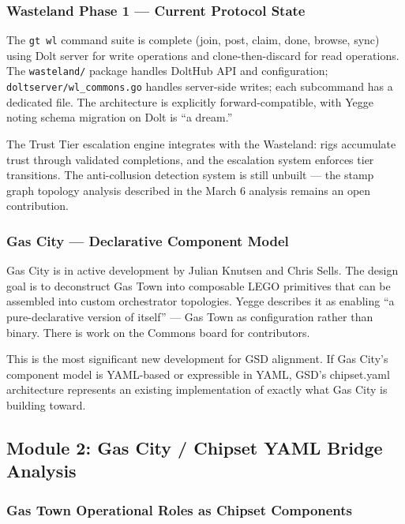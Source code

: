 \documentclass[11pt,letterpaper]{article}
\begin{document}
\subsubsection{Wasteland Phase 1 --- Current Protocol State}

The \texttt{gt wl} command suite is complete (join, post, claim, done, browse, sync) using Dolt server for write operations and clone-then-discard for read operations. The \texttt{wasteland/} package handles DoltHub API and configuration; \texttt{doltserver/wl\_commons.go} handles server-side writes; each subcommand has a dedicated file. The architecture is explicitly forward-compatible, with Yegge noting schema migration on Dolt is ``a dream.''

The Trust Tier escalation engine integrates with the Wasteland: rigs accumulate trust through validated completions, and the escalation system enforces tier transitions. The anti-collusion detection system is still unbuilt --- the stamp graph topology analysis described in the March 6 analysis remains an open contribution.

\subsubsection{Gas City --- Declarative Component Model}

Gas City is in active development by Julian Knutsen and Chris Sells. The design goal is to deconstruct Gas Town into composable LEGO primitives that can be assembled into custom orchestrator topologies. Yegge describes it as enabling ``a pure-declarative version of itself'' --- Gas Town as configuration rather than binary. There is work on the Commons board for contributors.

This is the most significant new development for GSD alignment. If Gas City's component model is YAML-based or expressible in YAML, GSD's chipset.yaml architecture represents an existing implementation of exactly what Gas City is building toward.

\subsection{Module 2: Gas City / Chipset YAML Bridge Analysis}

\subsubsection{Gas Town Operational Roles as Chipset Components}
\end{document}
